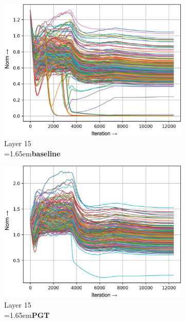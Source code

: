 \documentclass[runningheads]{llncs}
\newcommand{\forceindentb}{\parindent=1.65em\indent\parindent=0pt\relax}
\begin{document}
\begin{figure}[t]
\begin{subfigure}[t]{0.16\textwidth}
\includegraphics[width=\textwidth]{trimmed/baseline-w-layer-5-3}
\caption{Layer 15\\ \forceindentb\textbf{baseline}}
\end{subfigure}
\begin{subfigure}[t]{0.16\textwidth}
\includegraphics[width=\textwidth]{trimmed/pgt-w-layer-5-3}
\caption{Layer 15\\ \forceindentb\textbf{PGT}}
\end{subfigure}
\begin{subfigure}[t]{0.16\textwidth}

\end{subfigure}
\end{figure}
\end{document}

